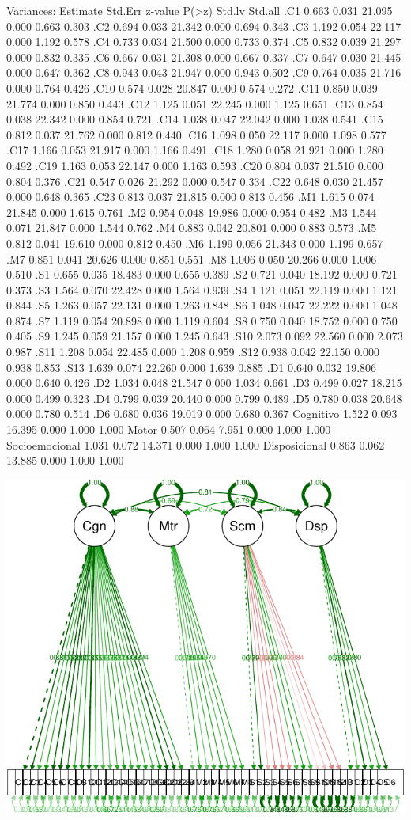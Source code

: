 \documentclass[
]{article}
\begin{document}
Variances: Estimate Std.Err z-value P(\textgreater\textbar z\textbar)
Std.lv Std.all .C1 0.663 0.031 21.095 0.000 0.663 0.303 .C2 0.694 0.033
21.342 0.000 0.694 0.343 .C3 1.192 0.054 22.117 0.000 1.192 0.578 .C4
0.733 0.034 21.500 0.000 0.733 0.374 .C5 0.832 0.039 21.297 0.000 0.832
0.335 .C6 0.667 0.031 21.308 0.000 0.667 0.337 .C7 0.647 0.030 21.445
0.000 0.647 0.362 .C8 0.943 0.043 21.947 0.000 0.943 0.502 .C9 0.764
0.035 21.716 0.000 0.764 0.426 .C10 0.574 0.028 20.847 0.000 0.574 0.272
.C11 0.850 0.039 21.774 0.000 0.850 0.443 .C12 1.125 0.051 22.245 0.000
1.125 0.651 .C13 0.854 0.038 22.342 0.000 0.854 0.721 .C14 1.038 0.047
22.042 0.000 1.038 0.541 .C15 0.812 0.037 21.762 0.000 0.812 0.440 .C16
1.098 0.050 22.117 0.000 1.098 0.577 .C17 1.166 0.053 21.917 0.000 1.166
0.491 .C18 1.280 0.058 21.921 0.000 1.280 0.492 .C19 1.163 0.053 22.147
0.000 1.163 0.593 .C20 0.804 0.037 21.510 0.000 0.804 0.376 .C21 0.547
0.026 21.292 0.000 0.547 0.334 .C22 0.648 0.030 21.457 0.000 0.648 0.365
.C23 0.813 0.037 21.815 0.000 0.813 0.456 .M1 1.615 0.074 21.845 0.000
1.615 0.761 .M2 0.954 0.048 19.986 0.000 0.954 0.482 .M3 1.544 0.071
21.847 0.000 1.544 0.762 .M4 0.883 0.042 20.801 0.000 0.883 0.573 .M5
0.812 0.041 19.610 0.000 0.812 0.450 .M6 1.199 0.056 21.343 0.000 1.199
0.657 .M7 0.851 0.041 20.626 0.000 0.851 0.551 .M8 1.006 0.050 20.266
0.000 1.006 0.510 .S1 0.655 0.035 18.483 0.000 0.655 0.389 .S2 0.721
0.040 18.192 0.000 0.721 0.373 .S3 1.564 0.070 22.428 0.000 1.564 0.939
.S4 1.121 0.051 22.119 0.000 1.121 0.844 .S5 1.263 0.057 22.131 0.000
1.263 0.848 .S6 1.048 0.047 22.222 0.000 1.048 0.874 .S7 1.119 0.054
20.898 0.000 1.119 0.604 .S8 0.750 0.040 18.752 0.000 0.750 0.405 .S9
1.245 0.059 21.157 0.000 1.245 0.643 .S10 2.073 0.092 22.560 0.000 2.073
0.987 .S11 1.208 0.054 22.485 0.000 1.208 0.959 .S12 0.938 0.042 22.150
0.000 0.938 0.853 .S13 1.639 0.074 22.260 0.000 1.639 0.885 .D1 0.640
0.032 19.806 0.000 0.640 0.426 .D2 1.034 0.048 21.547 0.000 1.034 0.661
.D3 0.499 0.027 18.215 0.000 0.499 0.323 .D4 0.799 0.039 20.440 0.000
0.799 0.489 .D5 0.780 0.038 20.648 0.000 0.780 0.514 .D6 0.680 0.036
19.019 0.000 0.680 0.367 Cognitivo 1.522 0.093 16.395 0.000 1.000 1.000
Motor 0.507 0.064 7.951 0.000 1.000 1.000 Socioemocional 1.031 0.072
14.371 0.000 1.000 1.000 Disposicional 0.863 0.062 13.885 0.000 1.000
1.000

\includegraphics{Info_Dinix_02_files/figure-latex/30_AFC-1.pdf}
\end{document}
